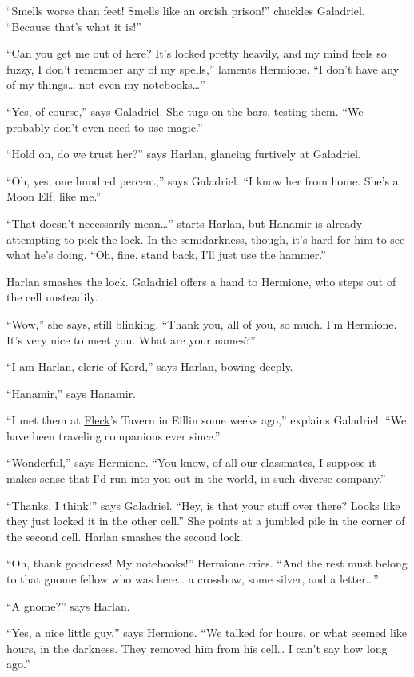 \documentclass[smalldemyvopaper,11pt,twoside,onecolumn,openright,extrafontsizes]{memoir}
\begin{document}
``Smells worse than feet! Smells like an orcish prison!'' chuckles
Galadriel. ``Because that's what it is!''

``Can you get me out of here? It's locked pretty heavily, and my mind
feels so fuzzy, I don't remember any of my spells,'' laments Hermione.
``I don't have any of my things\ldots{} not even my notebooks\ldots{}''

``Yes, of course,'' says Galadriel. She tugs on the bars, testing them.
``We probably don't even need to use magic.''

``Hold on, do we trust her?'' says Harlan, glancing furtively at
Galadriel.

``Oh, yes, one hundred percent,'' says Galadriel. ``I know her from
home. She's a Moon Elf, like me.''

``That doesn't necessarily mean\ldots{}'' starts Harlan, but Hanamir is
already attempting to pick the lock. In the semidarkness, though, it's
hard for him to see what he's doing. ``Oh, fine, stand back, I'll just
use the hammer.''

Harlan smashes the lock. Galadriel offers a hand to Hermione, who steps
out of the cell unsteadily.

``Wow,'' she says, still blinking. ``Thank you, all of you, so much. I'm
Hermione. It's very nice to meet you. What are your names?''

``I am Harlan, cleric of \href{/characters/kord/}{Kord},'' says Harlan,
bowing deeply.

``Hanamir,'' says Hanamir.

``I met them at \href{/characters/fleck/}{Fleck}'s Tavern in Eillin some
weeks ago,'' explains Galadriel. ``We have been traveling companions
ever since.''

``Wonderful,'' says Hermione. ``You know, of all our classmates, I
suppose it makes sense that I'd run into you out in the world, in such
diverse company.''

``Thanks, I think!'' says Galadriel. ``Hey, is that your stuff over
there? Looks like they just locked it in the other cell.'' She points at
a jumbled pile in the corner of the second cell. Harlan smashes the
second lock.

``Oh, thank goodness! My notebooks!'' Hermione cries. ``And the rest
must belong to that gnome fellow who was here\ldots{} a crossbow, some
silver, and a letter\ldots{}''

``A gnome?'' says Harlan.

``Yes, a nice little guy,'' says Hermione. ``We talked for hours, or
what seemed like hours, in the darkness. They removed him from his
cell\ldots{} I can't say how long ago.''
\end{document}
